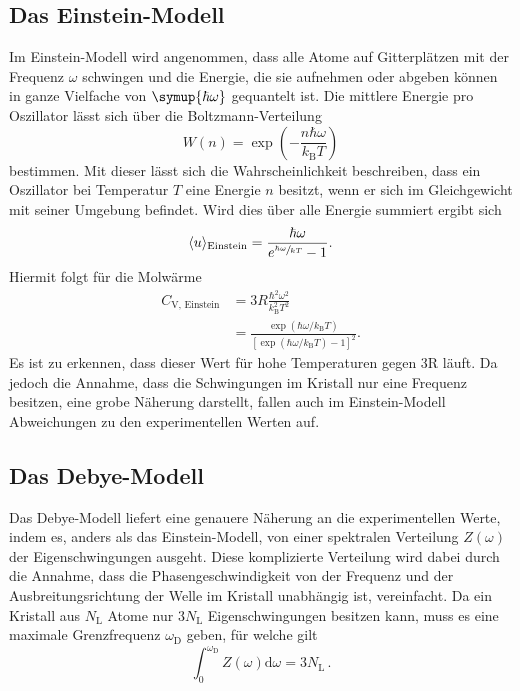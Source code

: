 \subsection{Das Einstein-Modell}
Im Einstein-Modell wird angenommen, dass alle Atome auf Gitterplätzen mit der Frequenz $\omega$ schwingen und die Energie, die sie aufnehmen oder abgeben können in ganze Vielfache
von $\symup{\hbar\omega}$ gequantelt ist. Die mittlere Energie pro Oszillator lässt sich über die Boltzmann-Verteilung
\begin{equation}
   W(n) = \exp\left( -\frac{n\hbar\omega}{k_\text{B}T} \right)
\end{equation}
bestimmen. Mit dieser lässt sich die Wahrscheinlichkeit beschreiben, dass ein Oszillator bei Temperatur $T$ eine Energie $n$ besitzt, wenn er sich im Gleichgewicht mit seiner Umgebung befindet.
Wird dies über alle Energie summiert ergibt sich
\begin{equation}
  \langle u\rangle_\text{Einstein}=\frac{\hbar\omega}{e^{\sfrac{\hbar\omega}{kT}}-1}.
\end{equation}
Hiermit folgt für die Molwärme
\begin{align}
  C_\text{V, Einstein} &= 3R\frac{\hbar^2\omega^2}{k_\text{B}^2T^2}\\
   &= \frac{\exp(\hbar\omega/k_\text{B}T)}{[\exp(\hbar\omega/k_\text{B}T)-1]^2}.
\end{align}
Es ist zu erkennen, dass dieser Wert für hohe Temperaturen gegen 3R läuft. Da jedoch die Annahme, dass die Schwingungen im Kristall nur eine Frequenz besitzen, eine grobe
Näherung darstellt, fallen auch im Einstein-Modell Abweichungen zu den experimentellen Werten auf.
\subsection{Das Debye-Modell}
Das Debye-Modell liefert eine genauere Näherung an die experimentellen Werte, indem es, anders als das Einstein-Modell, von einer spektralen Verteilung $Z(\omega)$ der Eigenschwingungen ausgeht.
Diese komplizierte Verteilung wird dabei durch die Annahme, dass die Phasengeschwindigkeit von der Frequenz und der Ausbreitungsrichtung der Welle im Kristall unabhängig ist, vereinfacht.
Da ein Kristall aus $N_\text{L}$ Atome nur $3N_\text{L}$ Eigenschwingungen besitzen kann, muss es eine maximale Grenzfrequenz $\omega_\text{D}$ geben, für welche gilt
\begin{equation}
  \int_0^{\omega_\text{D}} Z(\omega)\text{d}\omega = 3N_\text{L}\,.
\end{equation}
